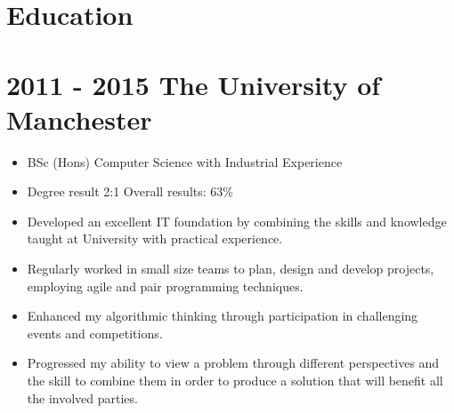 \documentclass[12pt,a4paper]{res}
\begin{document}
\begin{resume}
\section{\large\bf Education}
\vspace{5mm}

\section{\bf 2011 - 2015 \hspace{1.5mm}The University of Manchester}
  
  \begin{itemize} %
     \item[] BSc (Hons) Computer Science  with Industrial Experience
     \item[] Degree result 2:1 \hspace{10mm}Overall results: 63\% 

     \item Developed an excellent IT foundation by combining the skills and knowledge taught
     at University with practical experience.
     \item Regularly worked in small size teams to plan, design and develop projects,   employing agile and pair programming techniques.
     \item Enhanced my algorithmic thinking through participation in challenging events and competitions.
     \item Progressed my ability to view a problem through different perspectives and the skill to combine them in order to produce a solution that will benefit all the involved parties.
   \end{itemize}


\end{resume}
\end{document}
